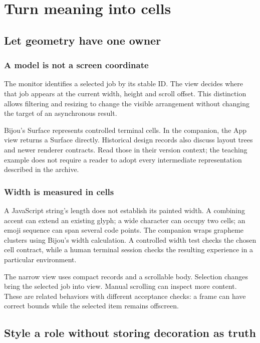 \chapter{Turn meaning into cells}\label{teaching-layout}

\section{Let geometry have one owner}
\subsection{A model is not a screen coordinate}

The monitor identifies a selected job by its stable ID. The view decides where that job appears at the current width, height and scroll offset. This distinction allows filtering and resizing to change the visible arrangement without changing the target of an asynchronous result.

Bijou's Surface represents controlled terminal cells. In the companion, the App view returns a Surface directly. Historical design records also discuss layout trees and newer renderer contracts. Read those in their version context; the teaching example does not require a reader to adopt every intermediate representation described in the archive.

\subsection{Width is measured in cells}

A JavaScript string's length does not establish its painted width. A combining accent can extend an existing glyph; a wide character can occupy two cells; an emoji sequence can span several code points. The companion wraps grapheme clusters using Bijou's width calculation. A controlled width test checks the chosen cell contract, while a human terminal session checks the resulting experience in a particular environment.

The narrow view uses compact records and a scrollable body. Selection changes bring the selected job into view. Manual scrolling can inspect more content. These are related behaviors with different acceptance checks: a frame can have correct bounds while the selected item remains offscreen.

\section{Style a role without storing decoration as truth}
